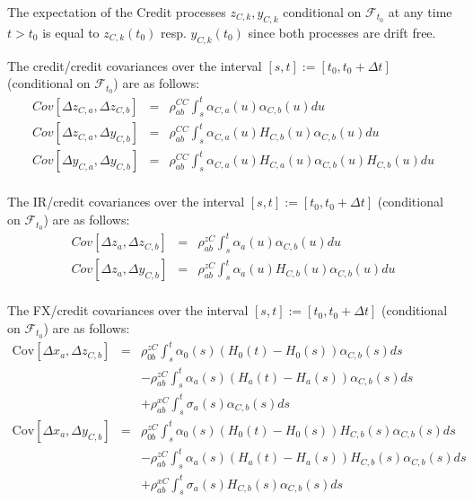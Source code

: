 \documentclass[12pt, a4paper]{article}
\begin{document}
{\begin{appendix}
The expectation of the Credit processes $z_{C,k}, y_{C,k}$ conditional on $\mathcal{F}_{t_0}$ at any time $t>t_0$ is
equal to $z_{C,k}(t_0)$ resp. $y_{C,k}(t_0)$ since both processes are drift free.

The credit/credit covariances over the interval $[s,t] := [t_0, t_0+\Delta t]$ (conditional on $\mathcal{F}_{t_0}$) are as follows:
\begin{eqnarray*}
	Cov \left[\Delta z_{C,a}, \Delta z_{C,b} \right] &=&
	\rho_{ab}^{CC}\int_s^t \alpha_{C, a}(u) \alpha_{C, b}(u) du\\
  Cov \left[\Delta z_{C,a}, \Delta y_{C,b} \right] &=&
	\rho_{ab}^{CC}\int_s^t \alpha_{C, a}(u) H_{C,b}(u) \alpha_{C, b}(u) du\\
  Cov \left[\Delta y_{C,a}, \Delta y_{C,b} \right] &=&
	\rho_{ab}^{CC}\int_s^t \alpha_{C, a}(u) H_{C,a}(u) \alpha_{C, b}(u) H_{C,b}(u) du\\
\end{eqnarray*}

The IR/credit covariances over the interval $[s,t] := [t_0, t_0+\Delta t]$ (conditional on $\mathcal{F}_{t_0}$) are as follows:
\begin{eqnarray*}
	Cov \left[\Delta z_a, \Delta z_{C,b} \right] &=&
	\rho_{ab}^{zC}\int_s^t \alpha_a(u) \alpha_{C, b}(u) du\\
  Cov \left[\Delta z_a, \Delta y_{C,b} \right] &=&
	\rho_{ab}^{zC}\int_s^t \alpha_a(u) H_{C,b}(u) \alpha_{C, b}(u) du\\
\end{eqnarray*}

The FX/credit covariances over the interval $[s,t] := [t_0, t_0+\Delta t]$ (conditional on $\mathcal{F}_{t_0}$) are as follows:
\begin{eqnarray*}
  \mathrm{Cov}[ \Delta x_a, \Delta z_{C,b} ] & = & \rho_{0b}^{zC} \int_s^t \alpha_0(s) (H_0(t)-H_0(s)) \alpha_{C,b}(s) ds \\
                                             & & -\rho_{ab}^{zC} \int_s^t \alpha_a(s)(H_a(t)-H_a(s))\alpha_{C,b}(s) ds \\
                                             & & +\rho_{ab}^{xC}\int_s^t \sigma_a(s) \alpha_{C,b}(s) ds \\
  \mathrm{Cov}[ \Delta x_a, \Delta y_{C,b} ] & = & \rho_{0b}^{zC} \int_s^t \alpha_0(s) (H_0(t)-H_0(s)) H_{C,b}(s)\alpha_{C,b}(s) ds \\
                                             & & -\rho_{ab}^{zC} \int_s^t \alpha_a(s)(H_a(t)-H_a(s))H_{C,b}(s)\alpha_{C,b}(s) ds \\
                                             & & +\rho_{ab}^{xC}\int_s^t \sigma_a(s) H_{C,b}(s)\alpha_{C,b}(s) ds
\end{eqnarray*}


\end{appendix}}
\end{document}
